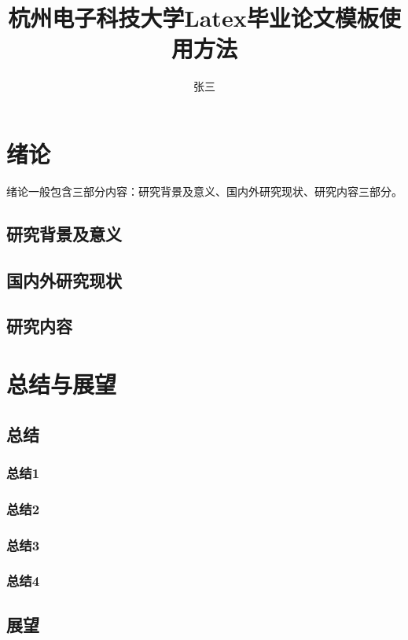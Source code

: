 \documentclass[master]{styles/hdu-thesis}
\title{杭州电子科技大学Latex毕业论文模板使用方法}{Munual of latex on thesis for HDU}
\author{张三}{San Zhang}%
\begin{document}
\makecover
\makedeclaration




\figurelist

\tablelist


\tableofcontents

\chapter{绪论}
  绪论一般包含三部分内容：研究背景及意义、国内外研究现状、研究内容三部分。
  \section{研究背景及意义}
  \section{国内外研究现状}
  \section{研究内容}

\ifdraft{
  
}{}

\chapter{总结与展望}
  \section{总结}
    \subsection{总结1}
    \subsection{总结2}
    \subsection{总结3}
    \subsection{总结4}
  \section{展望}
\end{document}
